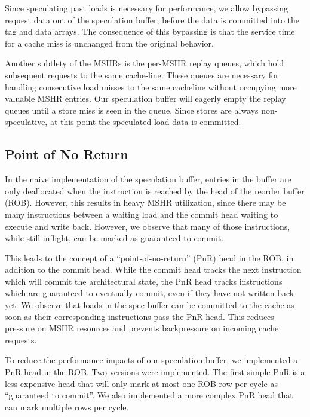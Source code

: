 Since speculating past loads is necessary for performance, we allow bypassing request data out of the speculation buffer, before the data is committed into the tag and data arrays. The consequence of this bypassing is that the service time for a cache miss is unchanged from the original behavior.

Another subtlety of the MSHRs is the per-MSHR replay queues, which hold subsequent requests to the same cache-line. These queues are necessary for handling consecutive load misses to the same cacheline without occupying more valuable MSHR entries. Our speculation buffer will eagerly empty the replay queues until a store miss is seen in the queue. Since stores are always non-speculative, at this point the speculated load data is committed.

\subsection{Point of No Return}
In the naive implementation of the speculation buffer, entries in the buffer are only deallocated when the instruction is reached by the head of the reorder buffer (ROB). However, this results in heavy MSHR utilization, since there may be many instructions between a waiting load and the commit head waiting to execute and write back. However, we observe that many of those instructions, while still inflight, can be marked as guaranteed to commit.

This leads to the concept of a ``point-of-no-return'' (PnR) head in the ROB, in addition to the commit head. While the commit head tracks the next instruction which will commit the architectural state, the PnR head tracks instructions which are guaranteed to eventually commit, even if they have not written back yet. We observe that loads in the spec-buffer can be committed to the cache as soon as their corresponding instructions pass the PnR head. This reduces pressure on MSHR resources and prevents backpressure on incoming cache requests.

To reduce the performance impacts of our speculation buffer, we implemented a PnR head in the ROB. Two versions were implemented. The first simple-PnR is a less expensive head that will only mark at most one ROB row per cycle as ``guaranteed to commit''. We also implemented a more complex PnR head that can mark multiple rows per cycle.

